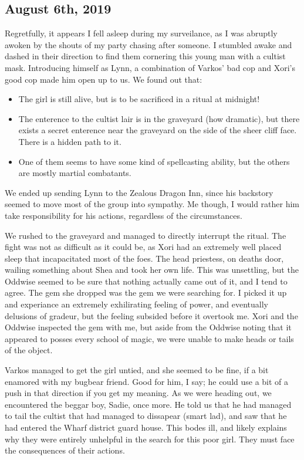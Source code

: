 \subsection{August 6th, 2019}
{\Fontauri
  Regretfully, it appears I fell asleep during my surveilance, as I was abruptly
  awoken by the shouts of my party chasing after someone. I stumbled awake and
  dashed in their direction to find them cornering this young man with a cultist
  mask. Introducing himself as Lynn, a combination of Varkos' bad cop and Xori's
  good cop made him open up to us. We found out that:
  \begin{itemize}
    \item The girl is still alive, but is to be sacrificed in a ritual at
      midnight!
    \item The enterence to the cultist lair is in the graveyard (how dramatic),
      but there exists a secret enterence near the graveyard on the side of the
      sheer cliff face. There is a hidden path to it.
    \item One of them seems to have some kind of spellcasting ability, but the
      others are mostly martial combatants.
  \end{itemize}
  We ended up sending Lynn to the Zealous Dragon Inn, since his backstory seemed
  to move most of the group into sympathy. Me though, I would rather him take
  responsibility for his actions, regardless of the circumstances.

  We rushed to the graveyard and managed to directly interrupt the ritual. The
  fight was not as difficult as it could be, as Xori had an extremely well
  placed sleep that incapacitated most of the foes. The head priestess, on
  deaths door, wailing something about Shea and took her own life. This was
  unsettling, but the Oddwise seemed to be sure that nothing actually came out
  of it, and I tend to agree. The gem she dropped was the gem we were searching
  for. I picked it up and experiance an extremely exhilirating feeling of power,
  and eventually delusions of gradeur, but the feeling subsided before it
  overtook me. Xori and the Oddwise inspected the gem with me, but aside from
  the Oddwise noting that it appeared to posses every school of magic, we were
  unable to make heads or tails of the object.

  Varkos managed to get the girl untied, and she seemed to be fine, if a bit
  enamored with my bugbear friend. Good for him, I say; he could use a bit of
  a push in that direction if you get my meaning. As we were heading out, we
  encountered the beggar boy, Sadie, once more. He told us that he had managed
  to tail the cultist that had managed to dissapear (smart lad), and saw that he
  had entered the Wharf district guard house. This bodes ill, and likely
  explains why they were entirely unhelpful in the search for this poor girl.
  They must face the consequences of their actions.
}
